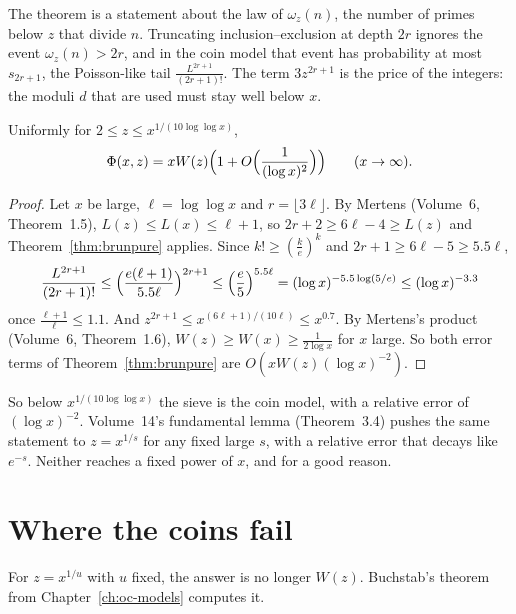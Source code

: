 The theorem is a statement about the law of $\omega_z(n)$, the number of primes below $z$ that divide $n$. Truncating inclusion--exclusion at depth $2r$ ignores the event $\omega_z(n)>2r$, and in the coin model that event has probability at most $s_{2r+1}$, the Poisson-like tail $\frac{L^{2r+1}}{(2r+1)!}$. The term $3z^{2r+1}$ is the price of the integers: the moduli $d$ that are used must stay well below $x$.

\begin{corollary}\label{cor:brunpure}
Uniformly for $2\le z\le x^{1/(10\log\log x)}$,
\[
\Phi(x,z)=xW(z)\Bigl(1+O\Bigl(\frac1{(\log x)^2}\Bigr)\Bigr)\qquad(x\to\infty).
\]
\end{corollary}
\begin{proof}
Let $x$ be large, $\ell=\log\log x$ and $r=\lfloor3\ell\rfloor$. By Mertens (Volume~6, Theorem~1.5), $L(z)\le L(x)\le\ell+1$, so $2r+2\ge6\ell-4\ge L(z)$ and Theorem~\ref{thm:brunpure} applies. Since $k!\ge(\frac ke)^k$ and $2r+1\ge6\ell-5\ge5.5\ell$,
\[
\frac{L^{2r+1}}{(2r+1)!}\le\Bigl(\frac{e(\ell+1)}{5.5\ell}\Bigr)^{2r+1}\le\Bigl(\frac e5\Bigr)^{5.5\ell}=(\log x)^{-5.5\log(5/e)}\le(\log x)^{-3.3}
\]
once $\frac{\ell+1}\ell\le1.1$. And $z^{2r+1}\le x^{(6\ell+1)/(10\ell)}\le x^{0.7}$. By Mertens's product (Volume~6, Theorem~1.6), $W(z)\ge W(x)\ge\frac1{2\log x}$ for $x$ large. So both error terms of Theorem~\ref{thm:brunpure} are $O(xW(z)(\log x)^{-2})$.
\end{proof}

So below $x^{1/(10\log\log x)}$ the sieve is the coin model, with a relative error of $(\log x)^{-2}$. Volume~14's fundamental lemma (Theorem~3.4) pushes the same statement to $z=x^{1/s}$ for any fixed large $s$, with a relative error that decays like $e^{-s}$. Neither reaches a fixed power of $x$, and for a good reason.

\section{Where the coins fail}

For $z=x^{1/u}$ with $u$ fixed, the answer is no longer $W(z)$. Buchstab's theorem from Chapter~\ref{ch:oc-models} computes it.

